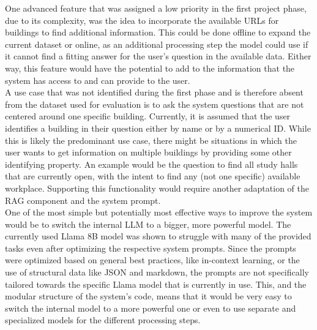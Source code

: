 \documentclass{article}
\begin{document}
One advanced feature that was assigned a low priority in the first project phase, due to its complexity, was the idea to incorporate the available URLs for buildings to find additional information. This could be done offline to expand the current dataset or online, as an additional processing step the model could use if it cannot find a fitting answer for the user's question in the available data. Either way, this feature would have the potential to add to the information that the system has access to and can provide to the user.\\

A use case that was not identified during the first phase and is therefore absent from the dataset used for evaluation is to ask the system questions that are not centered around one specific building. Currently, it is assumed that the user identifies a building in their question either by name or by a numerical ID. While this is likely the predominant use case, there might be situations in which the user wants to get information on multiple buildings by providing some other identifying property. An example would be the question to find all study halls that are currently open, with the intent to find any (not one specific) available workplace. Supporting this functionality would require another adaptation of the RAG component and the system prompt.\\

One of the most simple but potentially most effective ways to improve the system would be to switch the internal LLM to a bigger, more powerful model. The currently used Llama 8B model was shown to struggle with many of the provided tasks even after optimizing the respective system prompts. Since the prompts were optimized based on general best practices, like in-context learning, or the use of structural data like JSON and markdown, the prompts are not specifically tailored towards the specific Llama model that is currently in use. This, and the modular structure of the system's code, means that it would be very easy to switch the internal model to a more powerful one or even to use separate and specialized models for the different processing steps.
\end{document}
